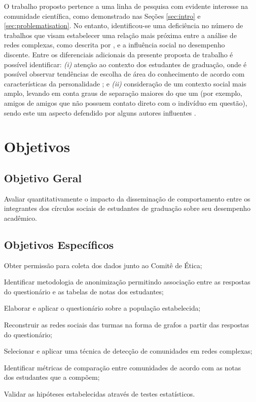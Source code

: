 O trabalho proposto pertence a uma linha de pesquisa com evidente interesse na comunidade científica, como demonstrado nas Seções \ref{sec:intro} e \ref{sec:problematisation}. No entanto, identificou-se uma deficiência no número de trabalhos que visam estabelecer uma relação mais próxima entre a análise de redes complexas, como descrita por , e a influência social no desempenho discente. Entre os diferenciais adicionais da presente proposta de trabalho é possível identificar: \textit{(i)} atenção ao contexto dos estudantes de graduação, onde é possível observar tendências de escolha de área do conhecimento de acordo com características da personalidade \cite{Vedel2016}; e \textit{(ii)} consideração de um contexto social mais amplo, levando em conta graus de separação maiores do que um (por exemplo, amigos de amigos que não possuem contato direto com o indivíduo em questão), sendo este um aspecto defendido por alguns autores influentes \cite{Christakis2009}.

\section{Objetivos} \label{ref:goals}

\subsection{Objetivo Geral}

Avaliar quantitativamente o impacto da disseminação de comportamento entre os integrantes dos círculos sociais de estudantes de graduação sobre seu desempenho acadêmico.

\subsection{Objetivos Específicos}

\vspace*{0pt}

\begin{alineas}[nosep] 
	\item Obter permissão para coleta dos dados junto ao Comitê de Ética;
    \item Identificar metodologia de anonimização permitindo associação entre as respostas do questionário e as tabelas de notas dos estudantes;
    \item Elaborar e aplicar o questionário sobre a população estabelecida;
    \item Reconstruir as redes sociais das turmas na forma de grafos a partir das respostas do questionário;
    \item Selecionar e aplicar uma técnica de detecção de comunidades em redes complexas;
    \item Identificar métricas de comparação entre comunidades de acordo com as notas dos estudantes que a compõem;
    \item Validar as hipóteses estabelecidas através de testes estatísticos.
\end{alineas}

